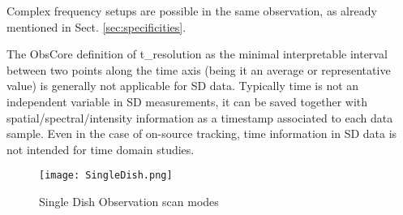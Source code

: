 \documentclass[11pt,a4paper]{ivoa}
\begin{document}
Complex frequency setups are possible in the same observation, as already mentioned in Sect. \ref{sec:specificities}.

The ObsCore definition of t\_resolution as the minimal interpretable interval between two points along the
time axis (being it an average or representative value) is generally not applicable for SD data. Typically time is not an independent variable in SD measurements, it can be saved together with spatial/spectral/intensity information as a timestamp associated to each data sample.
Even in the case of on-source tracking, time information in SD data is not intended for time domain studies.






\begin{figure}[H]
\centering

\texttt{[image: SingleDish.png]}
\caption{Single Dish Observation scan modes}
\label{fig:SD}
\end{figure}
\end{document}
